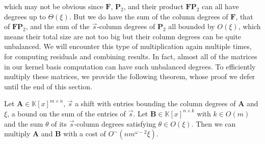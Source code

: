 which may not be obvious since $\mathbf{F}$, $\mathbf{P}_{2}$, and
their product $\mathbf{F}\mathbf{P}_{2}$ can all have degrees up
to $\Theta(\xi)$. But we do have the sum of the column degrees of
$\mathbf{F}$, that of $\mathbf{F}\mathbf{P}_{2}$, and the sum of
the $\vec{s}$-column degrees of $\mathbf{P}_{2}$ all bounded by
$O(\xi)$, which means their total size are not too big but their
column degrees can be quite unbalanced. We will encounter this type
of multiplication again multiple times, for computing residuals and
combining results. In fact, almost all of the matrices in our kernel
basis computation can have such unbalanced degrees. To efficiently
multiply these matrices, we provide the following theorem, whose proof
we defer until the end of this section. 
\begin{thm}
\label{thm:multiplyUnbalancedMatrices} Let $\mathbf{A}\in\mathbb{K}\left[x\right]^{m\times n}$,
$\vec{s}$ a shift with entries bounding the column degrees of $\mathbf{A}$
and $\xi$, a bound on the sum of the entries of $\vec{s}$. Let $\mathbf{B}\in\mathbb{K}\left[x\right]^{n\times k}$
with $k\in O\left(m\right)$ and the sum $\theta$ of its $\vec{s}$-column
degrees satisfying $\theta\in O\left(\xi\right)$. Then we can multiply
$\mathbf{A}$ and $\mathbf{B}$ with a cost of $O^{\sim}(nm^{\omega-2}\xi)$.
\begin{comment}
\begin{proof}
For simplicity we assume $m$ is a power of 2, something which can
be achieved by appending zero rows to $\mathbf{F}$. Divide the matrix
$\mathbf{B}$ into $\log m$ column blocks according to the $\vec{s}$-column
degrees of its columns. Let 
\[
\mathbf{B}=\left[\begin{array}{cccc}
\mathbf{B}^{\left(\log m\right)} & \mathbf{B}^{\left(\log m-1\right)} & \cdots & \mathbf{B}^{\left(1\right)}\end{array}\right],
\]
 with $\mathbf{B}^{\left(\log m\right)}$, $\mathbf{B}^{\left(\log m-1\right)},$
$\mathbf{B}^{\left(\log m-2\right)}$, ... , $\mathbf{B}^{\left(2\right)}$,
$\mathbf{B}^{\left(1\right)}$ having $\vec{s}$-column degrees in
the range $\left[0,2\xi/m\right]$, $(2\xi/m,4\xi/m]$, $(4\xi/m,8\xi/m]$,
...,$(\xi/4,\xi/2]$, $(\xi/2,\theta]$, respectively. We will multiply
$\mathbf{A}$ with each $\mathbf{B}^{\left(i\right)}$ separately.


\end{comment}
\end{thm}
